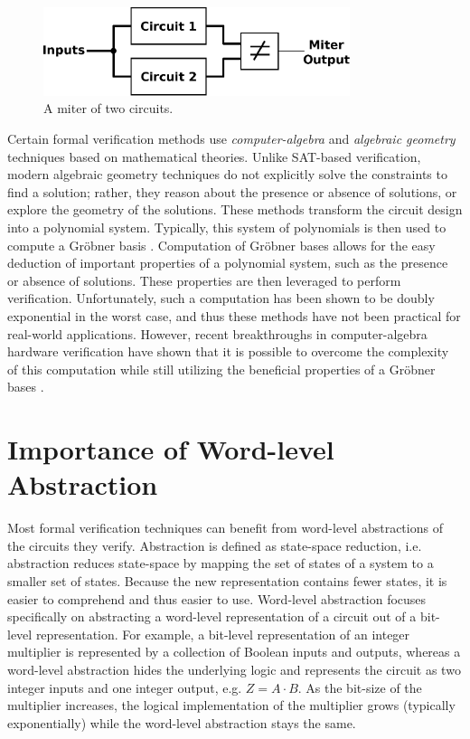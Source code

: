 {
\begin{figure}[h]
\centerline{
\includegraphics[width=0.8\textwidth]{./figures/betterMiter}
}
\caption{A miter of two circuits.}
\label{fig:miter}
\end{figure}
}

Certain formal verification methods use \emph{computer-algebra} and \emph{algebraic
geometry} techniques based on mathematical theories.
Unlike SAT-based verification, modern algebraic geometry 
techniques do not explicitly solve the constraints to find a solution; 
rather, they reason about the presence or absence of solutions, or explore
the geometry of the solutions.
These methods \cite{Avrunin:CAV} \cite{condrat-tacas07} \cite{gbverify:2007} 
transform the circuit design into a polynomial system. Typically, this system
of polynomials is then used to compute a Gr\"obner basis \cite{gb_book}. 
Computation of Gr\"obner bases allows for 
the easy deduction of important properties of a polynomial system, 
such as the presence or absence of 
solutions. These properties are then leveraged to perform 
verification. Unfortunately, such a computation 
has been shown to be doubly 
exponential in the worst case, and thus these methods have not been 
practical for real-world applications. However, recent
breakthroughs in computer-algebra hardware verification have shown
that it is possible to overcome the complexity of this computation while
still utilizing the beneficial properties of a Gr\"obner bases
\cite{lv:phd}.

\section{Importance of Word-level Abstraction}
Most formal verification techniques can benefit from word-level abstractions 
of the circuits they verify.
Abstraction is defined as state-space reduction, i.e{\text . }abstraction
reduces state-space by mapping the set of states of a system to a smaller 
set of states. Because the new representation contains fewer states, it
is easier to comprehend and thus easier to use. 
Word-level abstraction focuses specifically on abstracting a word-level
representation of a circuit out of a bit-level representation. For example,
a bit-level representation of an integer multiplier is represented by a
collection of Boolean inputs and outputs, whereas a word-level
abstraction hides the underlying logic and represents the circuit as two 
integer inputs and one integer output, e.g. $Z=A\cdot B$. As the bit-size of the
multiplier increases, the logical implementation of the multiplier grows (typically
exponentially) while the word-level abstraction stays the same.

